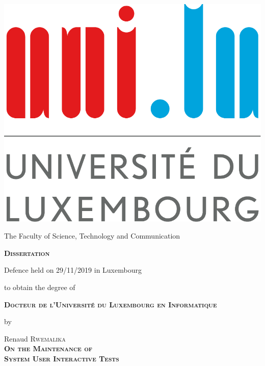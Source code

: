 \thispagestyle{empty}

\begin{center}         
         \includegraphics[width=0.2\linewidth]{figures/logo/logoul.pdf}
         \vspace{0.3cm}\noindent
         
         The Faculty of Science, Technology and Communication
         
         \vspace{1cm}\noindent
         {\LARGE \textbf{\textsc{Dissertation}}}
         
         \vspace{0.5cm}
         \noindent
         Defence held on 29/11/2019 in Luxembourg
         
         \vspace{0.5cm}\noindent
         to obtain the degree of
         
         \vspace{0.8cm}\noindent
         {\large \textbf{\textsc{Docteur de l'Université du Luxembourg en Informatique}}}

         \vspace{0.5cm}\noindent
         {\Large by}

         \vspace{0.5cm}\noindent
         {\Large Renaud \textsc{Rwemalika}}\\

         \vspace{1cm}\noindent
         {\LARGE \textbf{\textsc{On the Maintenance of}}}\\[0.4cm] 
         {\LARGE \textbf{\textsc{System User Interactive Tests}}}\\[0.4cm]
\end{center}

\vspace{0.4cm}


